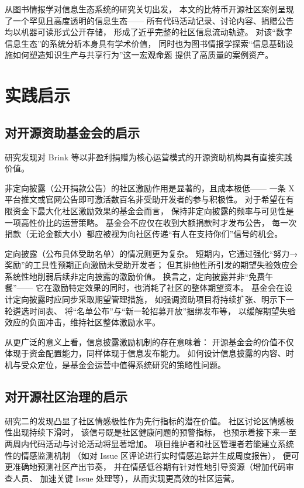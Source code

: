 从图书情报学对信息生态系统的研究关切出发，
本文的比特币开源社区案例呈现了一个罕见且高度透明的信息生态——
所有代码活动记录、讨论内容、捐赠公告均以机器可读形式公开存储，
形成了近乎完整的社区信息流动轨迹。
对该“数字信息生态”的系统分析本身具有学术价值，
同时也为图书情报学探索“信息基础设施如何塑造知识生产与共享行为”这一宏观命题
提供了高质量的案例资产\cite{alami2024sustainability}。


\section{实践启示}

\subsection{对开源资助基金会的启示}

研究发现对 Brink 等以非盈利捐赠为核心运营模式的开源资助机构具有直接实践价值。

非定向披露（公开捐款公告）的社区激励作用是显著的，且成本极低——
一条 X 平台推文或官网公告即可激活数百名非受助开发者的参与积极性。
对于希望在有限资金下最大化社区激励效果的基金会而言，
保持非定向披露的频率与可见性是一项高性价比的运营策略。
基金会不应仅在收到大额捐款时才发布公告，
每一次捐款（无论金额大小）都应被视为向社区传递“有人在支持你们”信号的机会。

定向披露（公布具体受助名单）的情况则更为复杂。
短期内，它通过强化“努力→奖励”的工具性预期正向激励未受助开发者；
但其排他性所引发的期望失验效应会系统性地削弱后续非定向披露的激励价值。
换言之，定向披露并非“免费午餐”——
它在激励特定效果的同时，也消耗了社区的整体期望资本。
基金会在设计定向披露时应同步采取期望管理措施，
如强调资助项目将持续扩张、明示下一轮遴选时间表、
将“名单公布”与“新一轮招募开放”捆绑发布等，
以缓解期望失验效应的负面冲击，维持社区整体激励水平。

从更广泛的意义上看，信息披露激励机制的存在意味着：
开源基金会的价值不仅体现于资金配置能力，同样体现于信息发布能力。
如何设计信息披露的内容、时机与受众定位，是基金会运营中值得系统研究的策略性问题。

\subsection{对开源社区治理的启示}

研究二的发现凸显了社区情感极性作为先行指标的潜在价值。
社区讨论区情感极性出现持续下滑时，
该信号既是社区健康问题的预警指标，
也预示着接下来一至两周内代码活动与讨论活动将显著增加。
项目维护者和社区管理者若能建立系统性的情感监测机制
（如对 Issue 区评论进行实时情感追踪并生成周度报告），
便可更准确地预测社区产出节奏，
并在情感低谷期有针对性地引导资源（增加代码审查人员、
加速关键 Issue 处理等），从而实现更高效的社区运营。


